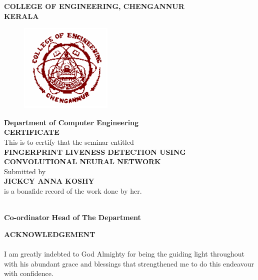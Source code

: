 \documentclass[a4paper,12pt,oneside]{article}
\begin{document}
\begin{center}
\setlength{\baselineskip}{1.5\baselineskip}
{\large\textbf{COLLEGE OF ENGINEERING, CHENGANNUR}}
\\
{\large\textbf{KERALA}}
\\
\begin{figure}[H]
\centering
\includegraphics{ceclogo.png}
\end{figure}
\setlength{\baselineskip}{1.5\baselineskip}
\textbf{Department of Computer Engineering}
\\
\textbf{CERTIFICATE}
\\
This is to certify that the seminar entitled
\\
\textbf{FINGERPRINT LIVENESS DETECTION USING CONVOLUTIONAL NEURAL NETWORK}
\\
Submitted by
\\
\textbf{JICKCY ANNA KOSHY}
\\
is a bonafide record of the work done by her.
\end{center}
\vspace{14ex}
\hspace{55ex}
\\
\vspace{2ex}
\hspace{0ex}
\textbf{
Co-ordinator}
\hspace{45ex}
\textbf{
Head of The Department}
\newpage
{}


\renewcommand{\headrulewidth}{0.0pt}
\renewcommand{\footrulewidth}{0.0pt}



\begin{center}
\large{\textbf{ACKNOWLEDGEMENT}}
\end{center}
\vspace{6ex}
\setlength{\baselineskip}{1.5\baselineskip}

\paragraph{}
I am greatly indebted to God Almighty for being the guiding light throughout with his
abundant grace and blessings that strengthened me to do this endeavour with confidence.
\end{document}
